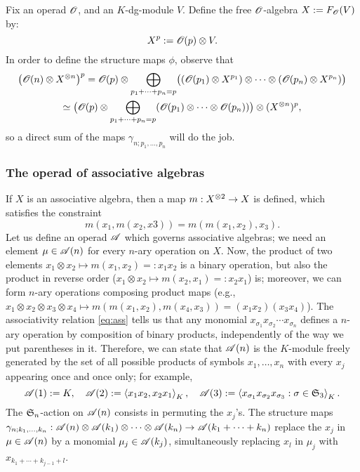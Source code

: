 \begin{example} Fix an operad ${\mathscr{O}_{}}$, and an
  $K$-dg-module $V$. Define the free ${\mathscr{O}_{}}$-algebra $X := F_{\mathscr{O}_{}}(V)$ by:
  \begin{equation*}
    X^p := {\mathscr{O}_{}}(p) \otimes V.
  \end{equation*}
  In order to define the structure maps $\phi$, observe that 
  \begin{multline*}
    \bigl( {\mathscr{O}_{}}(n) \otimes X\sp{\otimes n} \bigr)^p = {\mathscr{O}_{}}(p) \otimes \bigoplus_{p_1 + \cdots + p_n =
      p} \bigl( ({\mathscr{O}_{}}(p_1) \otimes X^{p_1}) \otimes \cdots \otimes ({\mathscr{O}_{}}(p_n) \otimes X^{p_n})
    \bigr) 
    \\
    \simeq \bigl( {\mathscr{O}_{}}(p) \otimes \bigoplus_{p_1 + \cdots + p_n =
      p} ({\mathscr{O}_{}}(p_1) \otimes \cdots \otimes {\mathscr{O}_{}}(p_n)) \bigr) \otimes (X\sp{\otimes n})^p,
  \end{multline*}
  so a direct sum of the maps $\gamma_{n; p_1, \ldots, p_n}$ will do the job.
\end{example}


\subsubsection{The operad of associative algebras}
\label{sec:operad-assoc}
If $X$ is an associative algebra, then a map $m: X\sp{\otimes 2} \to X$ is
defined, which satisfies the constraint
\begin{equation}
  \label{eq:ass}
  m(x_1, m(x_2, x3)) = m(m(x_1, x_2), x_3).
\end{equation}
Let us define an operad $\mathscr{A}$ which governs associative algebras; we
need an element $\mu \in \mathscr{A}(n)$ for every $n$-ary operation on $X$. Now,
the product of two elements $x_1 \otimes x_2 \mapsto m(x_1, x_2) =: x_1x_2$ is a
binary operation, but also the product in reverse order ($x_1 \otimes x_2
\mapsto m(x_2, x_1) =: x_2x_1$) is; moreover, we can form $n$-ary
operations composing product maps (e.g., $x_1 \otimes x_2 \otimes x_3 \otimes x_4 \mapsto
m(m(x_1, x_2), m(x_4, x_3)) = (x_1x_2)(x_3x_4)$).  The associativity
relation \eqref{eq:ass} tells us that any monomial $x_{\sigma_1} x_{\sigma_2}
\cdots x_{\sigma_n}$ defines a $n$-ary operation by composition of binary
products, independently of the way we put parentheses in it.
Therefore, we can state that $\mathscr{A}(n)$ is the $K$-module freely
generated by the set of all possible products of symbols $x_1, \ldots,
x_n$ with every $x_j$ appearing once and once only; for example,
\begin{equation*}
  \mathscr{A}(1) := K,
  \quad \mathscr{A}(2) := \left\langle x_1x_2, x_2x_1\right\rangle_K, 
  \quad \mathscr{A}(3) := \left\langle x_{\sigma_1}x_{\sigma_2}x_{\sigma_3} : \sigma \in \mathfrak{S}_{3}\right\rangle_K.
\end{equation*}
The $\mathfrak{S}_{n}$-action on $\mathscr{A}(n)$ consists in permuting the $x_j$'s.
The structure maps $\gamma_{n; k_1, \ldots, k_n}: \mathscr{A}(n) \otimes \mathscr{A}(k_1) \otimes \cdots \otimes
\mathscr{A}(k_n) \to \mathscr{A}(k_1 + \cdots + k_n)$ replace the $x_j$ in $\mu \in \mathscr{A}(n)$ by a
monomial $\mu_j \in \mathscr{A}(k_j)$, simultaneously replacing $x_l$ in $\mu_j$
with $x_{k_1 + \cdots + k_{j-1} + l}$.
  
